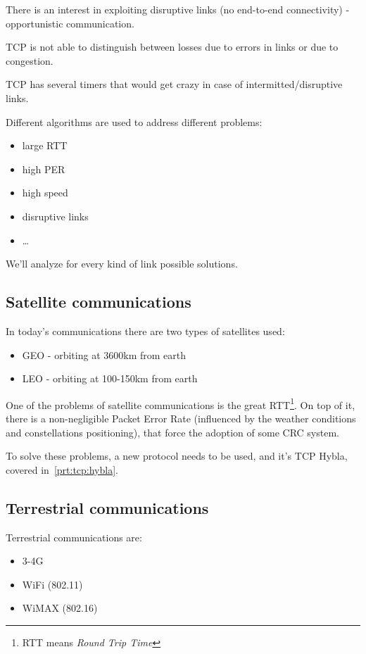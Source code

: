There is an interest in exploiting disruptive links (no end-to-end
connectivity) - opportunistic communication.

TCP is not able to distinguish between losses due to errors in links or due
to congestion.

TCP has several timers that would get crazy in case of intermitted/disruptive
links.

Different algorithms are used to address different problems:

\begin{itemize}
  \item large RTT
  \item high PER
  \item high speed
  \item disruptive links
  \item \dots
\end{itemize}

We'll analyze for every kind of link possible solutions.

\subsection{Satellite communications}
In today's communications there are two types of satellites used:
\begin{itemize}
\item GEO - orbiting at 3600km from earth
\item LEO - orbiting at 100-150km from earth
\end{itemize}
One of the problems of satellite communications is the great RTT\footnote{RTT
  means \textit{Round Trip Time}}. On top of it, there is a non-negligible
Packet Error Rate (influenced by the weather conditions and constellations
positioning), that force the adoption of some CRC system.

To solve these problems, a new protocol needs to be used, and it's TCP Hybla,
covered in~\ref{prt:tcp:hybla}.

\subsection{Terrestrial communications}
Terrestrial communications are:
\begin{itemize}
\item 3-4G
\item WiFi (802.11) 
\item WiMAX (802.16)
\end{itemize}

